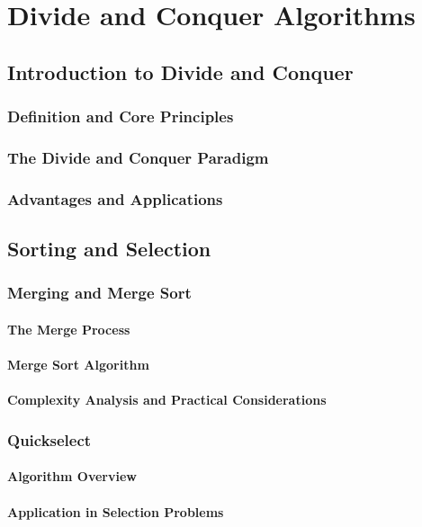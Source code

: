 \documentclass[12pt]{book} %
\begin{document}
\chapter{Divide and Conquer Algorithms}

\section{Introduction to Divide and Conquer}
\subsection{Definition and Core Principles}
\subsection{The Divide and Conquer Paradigm}
\subsection{Advantages and Applications}

\section{Sorting and Selection}
\subsection{Merging and Merge Sort}
\subsubsection{The Merge Process}
\subsubsection{Merge Sort Algorithm}
\subsubsection{Complexity Analysis and Practical Considerations}
\subsection{Quickselect}
\subsubsection{Algorithm Overview}
\subsubsection{Application in Selection Problems}
\end{document}
